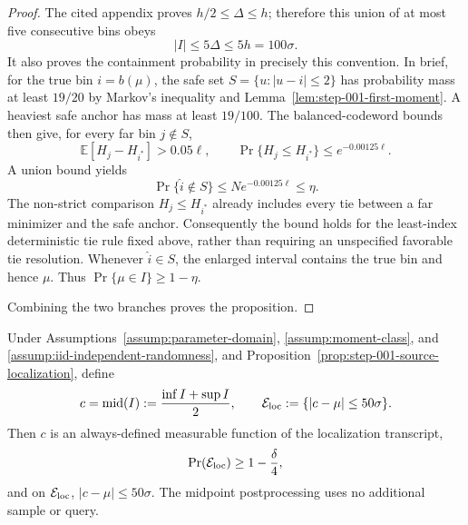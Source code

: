 \begin{proof}
The cited appendix proves \(h/2\leq\Delta\leq h\); therefore this union of at most five consecutive bins obeys
\[
|I|\leq5\Delta\leq5h=100\sigma.
\]
It also proves the containment probability in precisely this convention. In brief, for the true bin \(i=b(\mu)\), the safe set \(S=\{u:|u-i|\leq2\}\) has probability mass at least \(19/20\) by Markov's inequality and Lemma~\ref{lem:step-001-first-moment}. A heaviest safe anchor has mass at least \(19/100\). The balanced-codeword bounds then give, for every far bin \(j\notin S\),
\[
\mathbb E[H_j-H_{i^*}]>0.05\ell,
\qquad
\Pr\{H_j\leq H_{i^*}\}\leq e^{-0.00125\ell}.
\]
A union bound yields
\[
\Pr\{\widehat i\notin S\}
\leq N e^{-0.00125\ell}
\leq\eta.
\]
The non-strict comparison \(H_j\leq H_{i^*}\) already includes every tie between a far minimizer and the safe anchor. Consequently the bound holds for the least-index deterministic tie rule fixed above, rather than requiring an unspecified favorable tie resolution. Whenever \(\widehat i\in S\), the enlarged interval contains the true bin and hence \(\mu\). Thus \(\Pr\{\mu\in I\}\geq1-\eta\).

Combining the two branches proves the proposition.
\end{proof}

\begin{lemma}\label{lem:step-001-midpoint}
Under Assumptions~\ref{assump:parameter-domain}, \ref{assump:moment-class}, and \ref{assump:iid-independent-randomness}, and Proposition~\ref{prop:step-001-source-localization}, define
\[
c=\operatorname{mid}(I):=\frac{\inf I+\sup I}{2},
\qquad
\mathcal E_{\rm loc}:=\{|c-\mu|\leq50\sigma\}.
\]
Then \(c\) is an always-defined measurable function of the localization transcript,
\[
\Pr(\mathcal E_{\rm loc})\geq1-\frac\delta4,
\]
and on \(\mathcal E_{\rm loc}\), \(|c-\mu|\leq50\sigma\). The midpoint postprocessing uses no additional sample or query.
\end{lemma}

